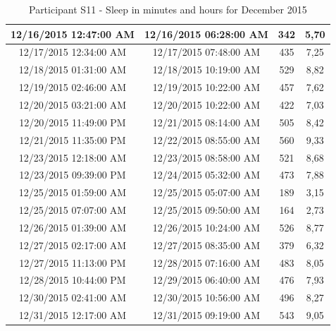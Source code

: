 \documentclass[12pt]{article} %
\begin{document}
\begin{table}[H]
\begin{footnotesize}
\begin{tabular}{| c | c | c | c |}
	\hline
12/16/2015 12:47:00 AM & 12/16/2015 06:28:00 AM	& 342 & 5,70\\
	\hline
12/17/2015 12:34:00 AM & 12/17/2015 07:48:00 AM	& 435 & 7,25\\
	\hline
12/18/2015 01:31:00 AM & 12/18/2015 10:19:00 AM	& 529 & 8,82\\
	\hline
\colorbox{blue!20}{12/19/2015 02:46:00 AM} & \colorbox{blue!20}{12/19/2015 10:22:00 AM} & \colorbox{blue!20}{457} & \colorbox{blue!20}{7,62}\\
	\hline
\colorbox{blue!30}{12/20/2015 03:21:00 AM} & \colorbox{blue!30}{12/20/2015 10:22:00 AM} & \colorbox{blue!30}{422} & \colorbox{blue!30}{7,03} \\
	\hline
\colorbox{blue!30}{12/20/2015 11:49:00 PM} & \colorbox{blue!30}{12/21/2015 08:14:00 AM} & \colorbox{blue!30}{505} & \colorbox{blue!30}{8,42}\\
	\hline
12/21/2015 11:35:00 PM & 12/22/2015 08:55:00 AM & 560 & 9,33\\
	\hline
12/23/2015 12:18:00 AM & 12/23/2015 08:58:00 AM & 521 & 8,68\\
	\hline
12/23/2015 09:39:00 PM & 12/24/2015 05:32:00 AM	& 473 & 7,88\\
	\hline
12/25/2015 01:59:00 AM & 12/25/2015 05:07:00 AM	& 189 & 3,15\\
	\hline
12/25/2015 07:07:00 AM & 12/25/2015 09:50:00 AM	& 164	& 2,73\\
	\hline
\colorbox{blue!20}{12/26/2015 01:39:00 AM} & \colorbox{blue!20}{12/26/2015 10:24:00 AM} & \colorbox{blue!20}{526} & \colorbox{blue!20}{8,77}\\
	\hline
\colorbox{blue!30}{12/27/2015 02:17:00 AM} & \colorbox{blue!30}{12/27/2015 08:35:00 AM} & \colorbox{blue!30}{379} & \colorbox{blue!30}{6,32} \\
	\hline
\colorbox{blue!30}{12/27/2015 11:13:00 PM} & \colorbox{blue!30}{12/28/2015 07:16:00 AM} & \colorbox{blue!30}{483} & \colorbox{blue!30}{8,05}\\
	\hline
12/28/2015 10:44:00 PM & 12/29/2015 06:40:00 AM	& 476 & 7,93\\
	\hline
12/30/2015 02:41:00 AM & 12/30/2015 10:56:00 AM & 496 & 8,27\\
	\hline
12/31/2015 12:17:00 AM & 12/31/2015 09:19:00 AM	& 543 & 9,05\\
	\hline
	\end{tabular}
	\caption{Participant S11 - Sleep in minutes and hours for December 2015}
	\label{tab:S11DecPhone}
\end{footnotesize}
\end{table}
\end{document}
